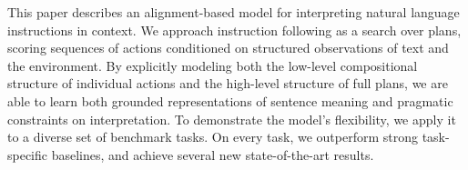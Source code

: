 This paper describes an alignment-based model for interpreting natural language instructions in context. We approach instruction following as a search over plans, scoring sequences of actions conditioned on structured observations of text and the environment. By explicitly modeling both the low-level compositional structure of individual actions and the high-level structure of full plans, we are able to learn both grounded representations of sentence meaning and pragmatic constraints on interpretation. To demonstrate the model's flexibility, we apply it to a diverse set of benchmark tasks. On every task, we outperform strong task-specific baselines, and achieve several new state-of-the-art results.
